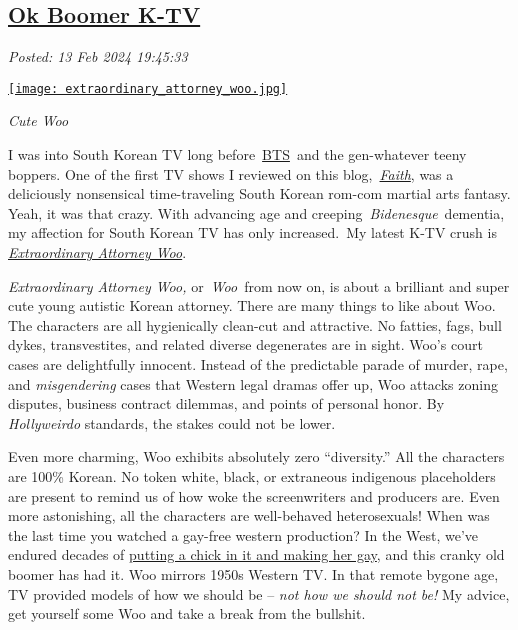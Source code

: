 %

\subsection*{\href{http://analyzethedatanotthedrivel.org/2024/02/13/ok-boomer-k-tv/}{Ok Boomer K-TV}}


\noindent\emph{Posted: 13 Feb 2024 19:45:33}
\vspace{6pt}

\captionsetup[floatingfigure]{labelformat=empty}
\begin{floatingfigure}[l]{0.24\textwidth}
\centering
\href{https://www.imdb.com/title/tt20869502/}{\texttt{[image: extraordinary\_attorney\_woo.jpg]}}
\label{fig:8005x0}
\caption[Extraordinary Attorney Woo]{\emph{Cute Woo}}
\end{floatingfigure}I was into South Korean TV long
before~\href{https://kprofiles.com/bts-bangtan-boys-members-profile/}{BTS}~and
the gen-whatever teeny boppers. One of the first TV shows I reviewed on
this
blog,~\href{https://analyzethedatanotthedrivel.org/2012/09/02/faith-a-guilty-pleasure/}{\emph{Faith}},
was a deliciously nonsensical time-traveling South Korean rom-com
martial arts fantasy. Yeah, it was that crazy. With advancing age and
creeping~\emph{Bidenesque}~dementia, my affection for South Korean TV
has only increased.~My latest K-TV crush is
\href{https://www.imdb.com/title/tt20869502/}{\emph{Extraordinary Attorney
Woo}}.


\emph{Extraordinary Attorney Woo,} or~\emph{Woo}~from now on, is about a
brilliant and super cute young autistic Korean attorney. There are many
things to like about Woo. The characters are all hygienically clean-cut
and attractive. No fatties, fags, bull dykes, transvestites, and related
diverse degenerates are in sight. Woo's court cases are delightfully
innocent. Instead of the predictable parade of murder, rape, and
\emph{misgendering} cases that Western legal dramas offer up, Woo
attacks zoning disputes, business contract dilemmas, and points of
personal honor. By \emph{Hollyweirdo} standards, the stakes could not be
lower.

Even more charming, Woo exhibits absolutely zero ``diversity.'' All the
characters are 100\% Korean. No token white, black, or extraneous
indigenous placeholders are present to remind us of how woke the
screenwriters and producers are. Even more astonishing, all the
characters are well-behaved heterosexuals! When was the last time you
watched a gay-free western production? In the West, we've endured
decades of \href{https://www.youtube.com/watch?v=9vJDcCcANnU}{putting a
chick in it and making her gay}, and this cranky old boomer has had it.
Woo mirrors 1950s Western TV. In that remote bygone age, TV provided
models of how we should be -- \emph{not how we should not be!} My
advice, get yourself some Woo and take a break from the bullshit.


%


